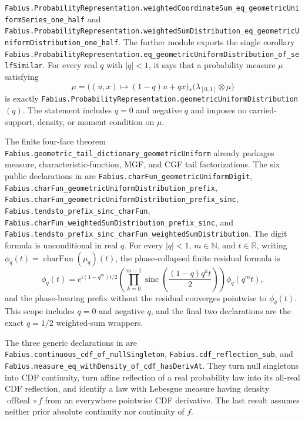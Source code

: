 \documentclass[11pt,oneside]{article}
\theoremstyle{definition}
\theoremstyle{remark}
\newcommand{\R}{\mathbb R}
\newcommand{\N}{\mathbb N}
\newcommand{\ii}{\mathrm i}
\newcommand{\1}{\mathbf 1}
\DeclareMathOperator{\sinc}{sinc}
\begin{document}
\begin{statusbox}
\nolinkurl{Fabius.ProbabilityRepresentation.weightedCoordinateSum_eq_geometricUniformSeries_one_half}
and
\nolinkurl{Fabius.ProbabilityRepresentation.weightedSumDistribution_eq_geometricUniformDistribution_one_half}.
The further module  exports the single corollary
\nolinkurl{Fabius.ProbabilityRepresentation.eq_geometricUniformDistribution_of_selfSimilar}.
For every real \(q\) with \(|q|<1\), it says that a probability measure \(\mu\) satisfying
\[
 \mu=\bigl((u,x)\mapsto(1-q)u+qx\bigr)_*
      \bigl(\lambda_{[0,1]}\otimes\mu\bigr)
\]
is exactly \nolinkurl{Fabius.ProbabilityRepresentation.geometricUniformDistribution}\((q)\).
The statement includes \(q=0\) and negative \(q\) and imposes no carried-support, density,
or moment condition on \(\mu\).

The finite four-face theorem
\nolinkurl{Fabius.geometric_tail_dictionary_geometricUniform} already packages measure,
characteristic-function, MGF, and CGF tail factorizations.  The six public declarations in
 are
\nolinkurl{Fabius.charFun_geometricUniformDigit},
\nolinkurl{Fabius.charFun_geometricUniformDistribution_prefix},
\nolinkurl{Fabius.charFun_geometricUniformDistribution_prefix_sinc},
\nolinkurl{Fabius.tendsto_prefix_sinc_charFun},
\nolinkurl{Fabius.charFun_weightedSumDistribution_prefix_sinc}, and
\nolinkurl{Fabius.tendsto_prefix_sinc_charFun_weightedSumDistribution}.
The digit formula is unconditional in real \(q\).  For every \(|q|<1\), \(m\in\N\), and
\(t\in\R\), writing \(\phi_q(t)=\operatorname{charFun}(\mu_q)(t)\), the phase-collapsed
finite residual formula is
\[
 \phi_q(t)=e^{\ii(1-q^m)t/2}
 \left(\prod_{k=0}^{m-1}
   \sinc\!\left(\frac{(1-q)q^kt}{2}\right)\right)
 \phi_q(q^m t),
\]
and the phase-bearing prefix without the residual converges pointwise to \(\phi_q(t)\).
This scope includes \(q=0\) and negative \(q\), and the final two declarations are the
exact \(q=1/2\) weighted-sum wrappers.

The three generic declarations in  are
\nolinkurl{Fabius.continuous_cdf_of_nullSingleton},
\nolinkurl{Fabius.cdf_reflection_sub}, and
\nolinkurl{Fabius.measure_eq_withDensity_of_cdf_hasDerivAt}.  They turn null singletons into
CDF continuity, turn affine reflection of a real probability law into its all-real CDF
reflection, and identify a law with Lebesgue measure having density
\(\operatorname{ofReal}\circ f\) from an everywhere pointwise CDF derivative.  The last
result assumes neither prior absolute continuity nor continuity of \(f\).


\end{statusbox}
\end{document}
